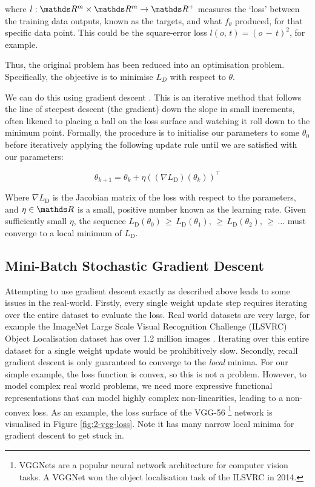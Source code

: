 where \(l : \R^m\times\R^m \rightarrow \R^+\) measures the `loss' between the training data outputs, known as the targets, and what \(f_{\theta}\) produced, for that specific data point. This could be the square-error loss \(l(o,\, t) = (o\,-\,t)^2\), for example.

Thus, the original problem has been reduced into an optimisation problem. Specifically, the objective is to minimise \(L_D\) with respect to \(\theta\).

We can do this using gradient descent \cite{Cauchy1847}. This is an iterative method that follows the line of steepest descent (the gradient) down the slope in small increments, often likened to placing a ball on the loss surface and watching it roll down to the minimum point. Formally, the procedure is to initialise our parameters to some \(\theta_0\) before iteratively applying the following update rule until we are satisfied with our parameters:

\begin{equation*}
    \theta_{k+1} = \theta_k + \eta((\nabla L_\mathrm{D})(\theta_k))^\top
\end{equation*}

Where \(\nabla L_\mathrm{D}\) is the Jacobian matrix of the loss with respect to the parameters, and \(\eta \in \R\) is a small, positive number known as the learning rate. Given sufficiently small \(\eta\), the sequence \(L_\mathrm{D}(\theta_0) \,\geq\, L_\mathrm{D}(\theta_1), \,\geq\, L_\mathrm{D}(\theta_2), \,\geq\, \ldots\) must converge to a local minimum of \(L_\mathrm{D}\).

\subsection{Mini-Batch Stochastic Gradient Descent}
Attempting to use gradient descent exactly as described above leads to some issues in the real-world. Firstly, every single weight update step requires iterating over the entire dataset to evaluate the loss. Real world datasets are very large, for example the ImageNet Large Scale Visual Recognition Challenge (ILSVRC) Object Localisation dataset has over 1.2 million images \cite{ILSVRC15}. Iterating over this entire dataset for a single weight update would be prohibitively slow. Secondly, recall gradient descent is only guaranteed to converge to the \textit{local} minima. For our simple example, the loss function is convex, so this is not a problem. However, to model complex real world problems, we need more expressive functional representations that can model highly complex non-linearities, leading to a non-convex loss. As an example, the loss surface of the VGG-56 \footnote{VGGNets are a popular neural network architecture for computer vision tasks. A VGGNet won the object localisation task of the ILSVRC in 2014.} network \cite{Simonyan2014} is visualised in Figure \ref{fig:2-vgg-loss}. Note it has many narrow local minima for gradient descent to get stuck in.

